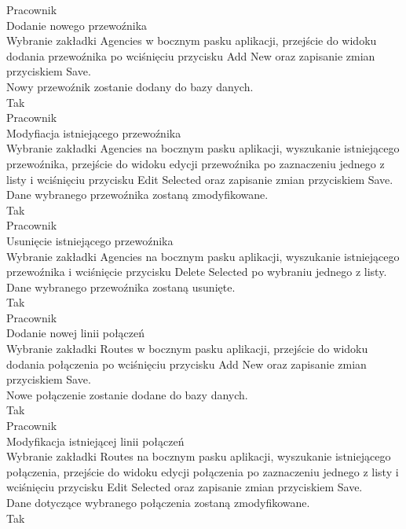 \documentclass[10pt,a4paper]{article}
\begin{document}
Pracownik\\
Dodanie nowego przewoźnika\\
Wybranie zakładki Agencies w bocznym pasku aplikacji, przejście do widoku dodania przewoźnika po wciśnięciu przycisku Add New oraz zapisanie zmian przyciskiem Save.\\
Nowy przewoźnik zostanie dodany do bazy danych.\\
Tak\\

Pracownik\\
Modyfiacja istniejącego przewoźnika\\
Wybranie zakładki Agencies na bocznym pasku aplikacji, wyszukanie istniejącego przewoźnika, przejście do widoku edycji przewoźnika po zaznaczeniu jednego z listy i wciśnięciu przycisku Edit Selected oraz zapisanie zmian przyciskiem Save.\\
Dane wybranego przewoźnika zostaną zmodyfikowane.\\
Tak\\

Pracownik\\
Usunięcie istniejącego przewoźnika\\
Wybranie zakładki Agencies na bocznym pasku aplikacji, wyszukanie istniejącego przewoźnika i wciśnięcie przycisku Delete Selected po wybraniu jednego z listy.\\
Dane wybranego przewoźnika zostaną usunięte.\\
Tak\\

Pracownik\\
Dodanie nowej linii połączeń\\
Wybranie zakładki Routes w bocznym pasku aplikacji, przejście do widoku dodania połączenia po wciśnięciu przycisku Add New oraz zapisanie zmian przyciskiem Save.\\
Nowe połączenie zostanie dodane do bazy danych.\\
Tak\\

Pracownik\\
Modyfikacja istniejącej linii połączeń\\
Wybranie zakładki Routes na bocznym pasku aplikacji, wyszukanie istniejącego połączenia, przejście do widoku edycji połączenia po zaznaczeniu jednego z listy i wciśnięciu przycisku Edit Selected oraz zapisanie zmian przyciskiem Save.\\
Dane dotyczące wybranego połączenia zostaną zmodyfikowane.\\
Tak\\
\end{document}
